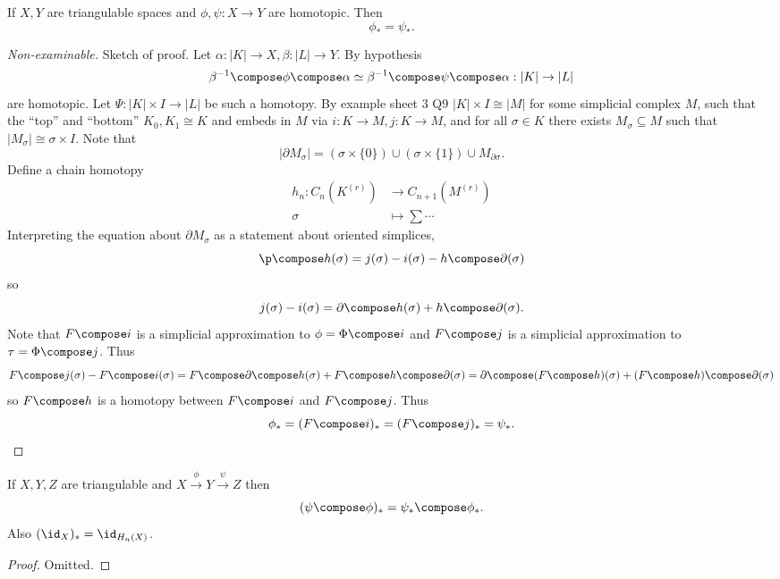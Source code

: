 \documentclass[a4paper]{article}
\renewcommand{\b}{\partial} %
\begin{document}
\begin{theorem}
  If \(X, Y\) are triangulable spaces and \(\phi, \psi: X \to Y\) are homotopic. Then
  \[
    \phi_* = \psi_*.
  \]
\end{theorem}

\begin{proof}[Non-examinable]
  Sketch of proof. Let \(\alpha: |K| \to X, \beta: |L| \to Y\). By hypothesis
  \[
    \beta^{-1} \compose \phi \compose \alpha \simeq \beta^{-1} \compose \psi \compose \alpha: |K| \to |L|
  \]
  are homotopic. Let \(\Psi: |K| \times I \to |L|\) be such a homotopy. By example sheet 3 Q9 \(|K| \times I \cong |M|\) for some simplicial complex \(M\), such that the ``top'' and ``bottom'' \(K_0, K_1 \cong K\) and embeds in \(M\) via \(i: K \to M, j: K \to M\), and for all \(\sigma \in K\) there exists \(M_\sigma \subseteq M\) such that \(|M_\sigma| \cong \sigma \times I\). Note that
  \[
    |\b M_\sigma| = (\sigma \times \{0\}) \cup (\sigma \times \{1\}) \cup M_{\b \sigma}.
  \]
  Define a chain homotopy
  \begin{align*}
    h_n: C_n(K^{(r)}) &\to C_{n + 1}(M^{(r)}) \\
    \sigma &\mapsto \sum \cdots
  \end{align*}
  Interpreting the equation about \(\b M_\sigma\) as a statement about oriented simplices,
  \[
    \p \compose h(\sigma) = j(\sigma) - i(\sigma) - h \compose \b(\sigma)
  \]
  so
  \[
    j(\sigma) - i(\sigma) = \b \compose h(\sigma) + h \compose \b(\sigma).
  \]
  Note that \(F \compose i\) is a simplicial approximation to \(\phi = \Phi \compose i\) and \(F \compose j\) is a simplicial approximation to \(\tau = \Phi \compose j\). Thus
  \[
    F \compose j(\sigma) - F \compose i(\sigma)
    = F \compose \b \compose h(\sigma) + F \compose h \compose \b(\sigma)
    = \b \compose (F \compose h)(\sigma) + (F \compose h) \compose \b(\sigma)
  \]
  so \(F \compose h\) is a homotopy between \(F \compose i\) and \(F \compose j\). Thus
  \[
    \phi_* = (F \compose i)_* = (F \compose j)_* = \psi_*.
  \]
\end{proof}

\begin{lemma}
  If \(X, Y, Z\) are triangulable and \(X \xrightarrow{\phi} Y \xrightarrow{\psi} Z\) then
  \[
    (\psi \compose \phi)_* = \psi_* \compose \phi_*.
  \]
  Also \((\id_X)_* = \id_{H_n(X)}\).
\end{lemma}

\begin{proof}
  Omitted.
\end{proof}
\end{document}
